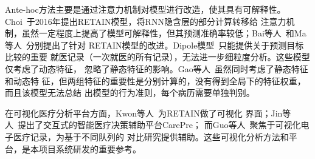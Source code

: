 Ante-hoc方法主要是通过注意力机制对模型进行改造，使其具有可解释性。
Choi~于2016年提出RETAIN模型，将RNN隐含层的部分计算转移给
注意力机制，虽然一定程度上提高了模型可解释性，但其预测准确率较低；Bai等人~和Ma等人~分别提出了针对
RETAIN模型的改进。Dipole模型~只能提供关于预测目标比较的重要
就医记录（一次就医的所有记录），无法进一步细粒度分析。这些模型仅考虑了动态特征，
忽略了静态特征的影响。Gao等人~虽然同时考虑了静态特征和动态特
征，但两组特征的重要性是分别计算的，没有得到全局下的特征权重，而且该模型无法总结
出模型的行为准则，每个病历需要单独判别。

在可视化医疗分析平台方面，Kwon等人~为RETAIN做了可视化
界面；Jin等人~提出了交互式的智能医疗决策辅助平台CarePre；
而Guo等人~聚焦于可视化电子医疗记录，为基于不同队列的
对比研究提供辅助。这些可视化分析方法和平台，是本项目系统研发的重要参考。



{}

\begin{spacing}{1.3} %
	 \songti
	
	
	\vspace{11bp}
\end{spacing}
